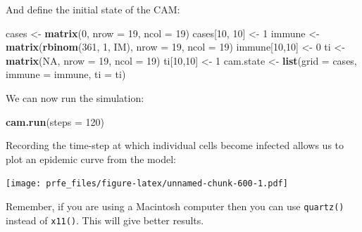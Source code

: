 \documentclass[12pt,a4paper]{book}
\newenvironment{Shaded}{\begin{snugshade}}{\end{snugshade}}
\newcommand{\DataTypeTok}[1]{\textcolor[rgb]{0.13,0.29,0.53}{#1}}
\newcommand{\DecValTok}[1]{\textcolor[rgb]{0.00,0.00,0.81}{#1}}
\newcommand{\KeywordTok}[1]{\textcolor[rgb]{0.13,0.29,0.53}{\textbf{#1}}}
\newcommand{\NormalTok}[1]{#1}
\newcommand{\OperatorTok}[1]{\textcolor[rgb]{0.81,0.36,0.00}{\textbf{#1}}}
\newcommand{\OtherTok}[1]{\textcolor[rgb]{0.56,0.35,0.01}{#1}}
\newcommand{\StringTok}[1]{\textcolor[rgb]{0.31,0.60,0.02}{#1}}
\theoremstyle{definition}
\theoremstyle{definition}
\theoremstyle{definition}
\theoremstyle{remark}
\begin{document}
And define the initial state of the CAM:

\begin{Shaded}
\begin{Highlighting}[]
\NormalTok{cases <-}\StringTok{ }\KeywordTok{matrix}\NormalTok{(}\DecValTok{0}\NormalTok{, }\DataTypeTok{nrow =} \DecValTok{19}\NormalTok{, }\DataTypeTok{ncol =} \DecValTok{19}\NormalTok{)}
\NormalTok{cases[}\DecValTok{10}\NormalTok{, }\DecValTok{10}\NormalTok{] <-}\StringTok{ }\DecValTok{1}
\NormalTok{immune <-}\StringTok{ }\KeywordTok{matrix}\NormalTok{(}\KeywordTok{rbinom}\NormalTok{(}\DecValTok{361}\NormalTok{, }\DecValTok{1}\NormalTok{, IM), }\DataTypeTok{nrow =} \DecValTok{19}\NormalTok{, }\DataTypeTok{ncol =} \DecValTok{19}\NormalTok{)}
\NormalTok{immune[}\DecValTok{10}\NormalTok{,}\DecValTok{10}\NormalTok{] <-}\StringTok{ }\DecValTok{0}
\NormalTok{ti <-}\StringTok{ }\KeywordTok{matrix}\NormalTok{(}\OtherTok{NA}\NormalTok{, }\DataTypeTok{nrow =} \DecValTok{19}\NormalTok{, }\DataTypeTok{ncol =} \DecValTok{19}\NormalTok{)}
\NormalTok{ti[}\DecValTok{10}\NormalTok{,}\DecValTok{10}\NormalTok{] <-}\StringTok{ }\DecValTok{1}
\NormalTok{cam.state <-}\StringTok{ }\KeywordTok{list}\NormalTok{(}\DataTypeTok{grid =}\NormalTok{ cases, }\DataTypeTok{immune =}\NormalTok{ immune, }\DataTypeTok{ti =}\NormalTok{ ti)}
\end{Highlighting}
\end{Shaded}

We can now run the simulation:

\begin{Shaded}
\begin{Highlighting}[]
\KeywordTok{cam.run}\NormalTok{(}\DataTypeTok{steps =} \DecValTok{120}\NormalTok{)}
\end{Highlighting}
\end{Shaded}

Recording the time-step at which individual cells become infected allows
us to plot an epidemic curve from the model:

\begin{Shaded}
\end{Shaded}

\texttt{[image: prfe\_files/figure-latex/unnamed-chunk-600-1.pdf]}

Remember, if you are using a Macintosh computer then you can use
\texttt{quartz()} instead of \texttt{x11()}. This will give better
results.
\end{document}
